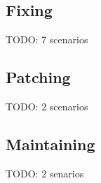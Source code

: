 \subsection{Fixing}
TODO: 7 scenarios
%
%
%
%
%
%
%


\subsection{Patching}
TODO: 2 scenarios
%
%


\subsection{Maintaining}
TODO: 2 senarios
%
%


